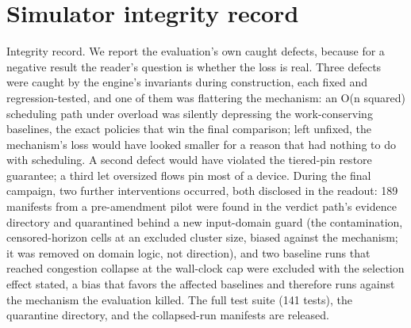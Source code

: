 \section{Simulator integrity record}

Integrity record. We report the evaluation's own caught defects, because
for a negative result the reader's question is whether the loss is real.
Three defects were caught by the engine's invariants during construction,
each fixed and regression-tested, and one of them was flattering the
mechanism: an O(n squared) scheduling path under overload was silently
depressing the work-conserving baselines, the exact policies that win the
final comparison; left unfixed, the mechanism's loss would have looked
smaller for a reason that had nothing to do with scheduling. A second
defect would have violated the tiered-pin restore guarantee; a third let
oversized flows pin most of a device. During the final campaign, two
further interventions occurred, both disclosed in the readout: 189
manifests from a pre-amendment pilot were found in the verdict path's
evidence directory and quarantined behind a new input-domain guard (the
contamination, censored-horizon cells at an excluded cluster size, biased
against the mechanism; it was removed on domain logic, not direction), and
two baseline runs that reached congestion collapse at the wall-clock cap
were excluded with the selection effect stated, a bias that favors the
affected baselines and therefore runs against the mechanism the evaluation
killed. The full test suite (141 tests), the quarantine directory, and the
collapsed-run manifests are released.
